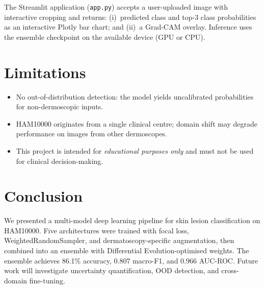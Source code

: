 \documentclass[10pt,twocolumn]{article}
\begin{document}
The Streamlit application (\texttt{app.py}) accepts a user-uploaded image with interactive cropping and returns: (i)~predicted class and top-3 class probabilities as an interactive Plotly bar chart; and (ii)~a Grad-CAM overlay. Inference uses the ensemble checkpoint on the available device (GPU or CPU).

\section{Limitations}
\label{sec:limitations}

\begin{itemize}[noitemsep, leftmargin=*]
  \item No out-of-distribution detection: the model yields uncalibrated probabilities for non-dermoscopic inputs.
  \item HAM10000 originates from a single clinical centre; domain shift may degrade performance on images from other dermoscopes.
  \item This project is intended for \textit{educational purposes only} and must not be used for clinical decision-making.
\end{itemize}

\section{Conclusion}
\label{sec:conclusion}

We presented a multi-model deep learning pipeline for skin lesion classification on HAM10000. Five architectures were trained with focal loss, WeightedRandomSampler, and dermatoscopy-specific augmentation, then combined into an ensemble with Differential Evolution-optimised weights. The ensemble achieves 86.1\% accuracy, 0.807 macro-F1, and 0.966 AUC-ROC. Future work will investigate uncertainty quantification, OOD detection, and cross-domain fine-tuning.
\end{document}
